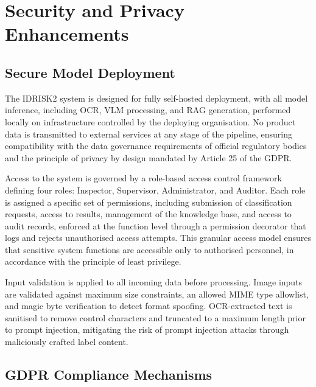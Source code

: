 \hypertarget{security-and-privacy-enhancements}{%
\section{Security and Privacy Enhancements}\label{security-and-privacy-enhancements}}

\hypertarget{secure-model-deployment}{%
\subsection{Secure Model Deployment}\label{secure-model-deployment}}

The IDRISK2 system is designed for fully self-hosted deployment, with all model inference, including OCR, VLM processing, and RAG generation, performed locally on infrastructure controlled by the deploying organisation. No product data is transmitted to external services at any stage of the pipeline, ensuring compatibility with the data governance requirements of official regulatory bodies and the principle of privacy by design mandated by Article 25 of the GDPR.

Access to the system is governed by a role-based access control framework defining four roles: Inspector, Supervisor, Administrator, and Auditor. Each role is assigned a specific set of permissions, including submission of classification requests, access to results, management of the knowledge base, and access to audit records, enforced at the function level through a permission decorator that logs and rejects unauthorised access attempts. This granular access model ensures that sensitive system functions are accessible only to authorised personnel, in accordance with the principle of least privilege.

Input validation is applied to all incoming data before processing. Image inputs are validated against maximum size constraints, an allowed MIME type allowlist, and magic byte verification to detect format spoofing. OCR-extracted text is sanitised to remove control characters and truncated to a maximum length prior to prompt injection, mitigating the risk of prompt injection attacks through maliciously crafted label content.

\hypertarget{gdpr-compliance-mechanisms}{%
\subsection{GDPR Compliance Mechanisms}\label{gdpr-compliance-mechanisms}}

